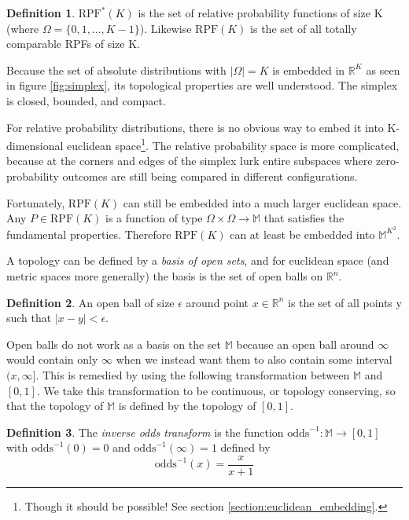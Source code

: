 \documentclass[twoside]{article}
\theoremstyle{plain}%
\theoremstyle{definition}
\newtheorem{definition}{Definition}[section]
\theoremstyle{remark}
\begin{document}
\begin{definition}
\(\text{RPF}^{\ast}(K)\) is the set of relative probability functions of size K (where \(\Omega = \{0, 1, ..., K - 1\}\)). Likewise \(\text{RPF}(K)\) is the set of all totally comparable RPFs of size K.
\end{definition}

Because the set of absolute distributions with \(|\Omega| = K\) is embedded in \(\mathbb{R}^K\) as seen in figure \ref{fig:simplex}, its topological properties are well understood. The simplex is closed, bounded, and compact.

For relative probability distributions, there is no obvious way to embed it into K-dimensional euclidean space\footnote{Though it should be possible! See section \ref{section:euclidean_embedding}.}. The relative probability space is more complicated, because at the corners and edges of the simplex lurk entire subspaces where zero-probability outcomes are still being compared in different configurations.

Fortunately, \(\text{RPF}(K)\) can still be embedded into a much larger euclidean space. Any \(P \in \text{RPF}(K)\) is a function of type \(\Omega \times \Omega \rightarrow \mathbb{M}\) that satisfies the fundamental properties. Therefore \(\text{RPF}(K)\) can at least be embedded into \(\mathbb{M}^{K^2}\).

A topology can be defined by a \textit{basis of open sets}, and for euclidean space (and metric spaces more generally) the basis is the set of open balls on \(\mathbb{R}^n\).

\begin{definition}
An open ball of size \(\epsilon\) around point \(x \in \mathbb{R}^n\) is the set of all points y such that \(|x - y| < \epsilon\).
\end{definition}

Open balls do not work as a basis on the set \(\mathbb{M}\) because an open ball around \(\infty\) would contain only \(\infty\) when we instead want them to also contain some interval \((x, \infty]\). This is remedied by using the following transformation between \(\mathbb{M}\) and \([0, 1]\). We take this transformation to be continuous, or topology conserving, so that the topology of \(\mathbb{M}\) is defined by the topology of \([0, 1]\).

\begin{definition}
The \textit{inverse odds transform} is the function \(\text{odds}^{-1}: \mathbb{M} \rightarrow [0, 1]\) with \(\text{odds}^{-1}(0) = 0\) and \(\text{odds}^{-1}(\infty) = 1\) defined by
\[\text{odds}^{-1}(x) = \frac{x}{x + 1}\]
\end{definition}
\end{document}
